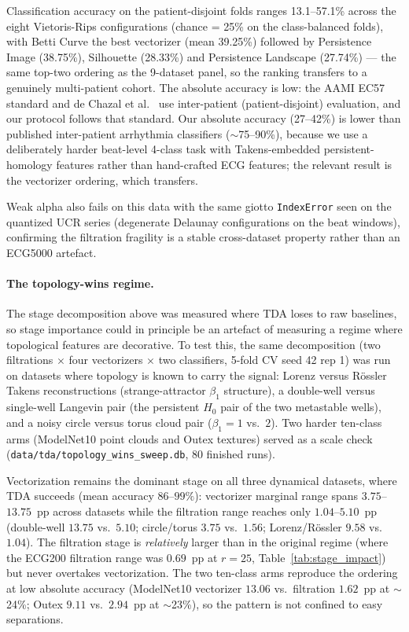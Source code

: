 \documentclass[12pt, a4paper]{report}
\theoremstyle{definition}
\theoremstyle{plain}
\theoremstyle{remark}
\begin{document}
Classification accuracy on the patient-disjoint folds ranges
13.1--57.1\% across the eight Vietoris-Rips configurations
(chance = 25\% on the class-balanced folds), with Betti Curve the
best vectorizer (mean 39.25\%) followed by Persistence Image
(38.75\%), Silhouette (28.33\%) and Persistence Landscape
(27.74\%) --- the same top-two ordering as the 9-dataset panel, so
the ranking transfers to a genuinely multi-patient cohort. The
absolute accuracy is low: the AAMI EC57 standard and de Chazal
et al.~\cite{dechazal2004} use inter-patient (patient-disjoint)
evaluation, and our protocol follows that standard. Our absolute
accuracy (27--42\%) is lower than published inter-patient
arrhythmia classifiers ($\sim$75--90\%), because we use a
deliberately harder beat-level 4-class task with Takens-embedded
persistent-homology features rather than hand-crafted ECG features;
the relevant result is the vectorizer ordering, which transfers.

Weak alpha also fails on
this data with the same giotto \texttt{IndexError} seen on the
quantized UCR series (degenerate Delaunay configurations on the
beat windows), confirming the filtration fragility is a
stable cross-dataset property rather than an ECG5000 artefact.

\paragraph{The topology-wins regime.} The stage
decomposition above was measured where TDA loses to raw baselines, so
stage importance could in principle be an artefact of measuring a
regime where topological features are decorative. To test this, the
same decomposition (two filtrations $\times$ four vectorizers $\times$
two classifiers, 5-fold CV seed 42 rep 1) was run on datasets where
topology is known to carry the signal: Lorenz versus R\"ossler Takens
reconstructions (strange-attractor $\beta_1$ structure), a double-well
versus single-well Langevin pair (the persistent $H_0$ pair of the two
metastable wells), and a noisy circle versus torus cloud pair ($\beta_1
{=}1$ vs.\ $2$). Two harder ten-class arms (ModelNet10 point
clouds and Outex textures) served as a scale check
(\texttt{data/tda/topology\_wins\_sweep.db}, 80 finished runs).

Vectorization remains the dominant stage on all
three dynamical datasets, where TDA succeeds (mean accuracy
$86$--$99\%$):
vectorizer marginal range spans $3.75$--$13.75$~pp across datasets
while the filtration range reaches only $1.04$--$5.10$~pp (double-well
$13.75$ vs.\ $5.10$; circle/torus $3.75$ vs.\ $1.56$; Lorenz/R\"ossler
$9.58$ vs.\ $1.04$). The filtration stage is \emph{relatively} larger
than in the original regime (where the ECG200 filtration range was
$0.69$~pp at $r{=}25$, Table~\ref{tab:stage_impact}) but
never overtakes vectorization. The two ten-class arms reproduce the
ordering at low absolute accuracy (ModelNet10 \cite{wu2015} vectorizer $13.06$ vs.\
filtration $1.62$~pp at $\sim$24\%; Outex \cite{ojala2002} $9.11$ vs.\ $2.94$~pp at
$\sim$23\%), so the pattern is not confined to easy separations.
\end{document}

